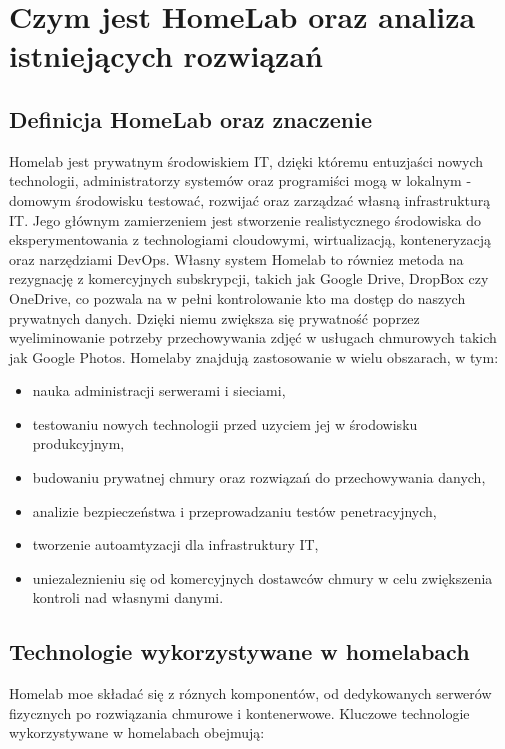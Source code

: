 \chapter{Czym jest HomeLab oraz analiza istniejących rozwiązań}

\section{Definicja HomeLab oraz znaczenie}
Homelab jest prywatnym środowiskiem IT, dzięki któremu entuzjaści nowych technologii, administratorzy systemów oraz programiści mogą w lokalnym - domowym środowisku testować, rozwijać oraz zarządzać własną infrastrukturą IT. Jego głównym zamierzeniem jest stworzenie realistycznego środowiska do eksperymentowania z technologiami cloudowymi, wirtualizacją, konteneryzacją oraz narzędziami DevOps. Własny system Homelab to równiez metoda na rezygnację z komercyjnych subskrypcji, takich jak Google Drive, DropBox czy OneDrive, co pozwala na w pełni kontrolowanie kto ma dostęp do naszych prywatnych danych. Dzięki niemu zwiększa się prywatność poprzez wyeliminowanie potrzeby przechowywania zdjęć w usługach chmurowych takich jak Google Photos.
Homelaby znajdują zastosowanie w wielu obszarach, w tym:
\begin{itemize}
    \item nauka administracji serwerami i sieciami,
    \item testowaniu nowych technologii przed uzyciem jej w środowisku produkcyjnym,
    \item budowaniu prywatnej chmury oraz rozwiązań do przechowywania danych,
    \item analizie bezpieczeństwa i przeprowadzaniu testów penetracyjnych,
    \item tworzenie autoamtyzacji dla infrastruktury IT,
    \item uniezaleznieniu się od komercyjnych dostawców chmury w celu zwiększenia kontroli nad własnymi danymi.
\end{itemize}

\section{Technologie wykorzystywane w homelabach}
Homelab moe składać się z róznych komponentów, od dedykowanych serwerów fizycznych po rozwiązania chmurowe i kontenerwowe. Kluczowe technologie wykorzystywane w homelabach obejmują:

